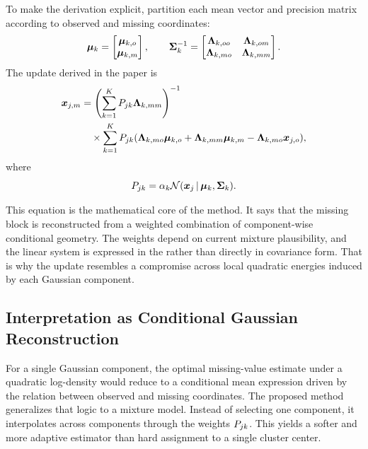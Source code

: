 To make the derivation explicit, partition each mean vector and precision matrix according to observed and missing coordinates:
\[
    \bm{\mu}_k =
    \begin{bmatrix}
        \bm{\mu}_{k,o}\\
        \bm{\mu}_{k,m}
    \end{bmatrix},
    \qquad
    \mathbf{\Sigma}_k^{-1} =
    \begin{bmatrix}
        \mathbf{\Lambda}_{k,oo} & \mathbf{\Lambda}_{k,om}\\
        \mathbf{\Lambda}_{k,mo} & \mathbf{\Lambda}_{k,mm}
    \end{bmatrix}.
\]
The update derived in the paper is
\begin{equation}
\begin{aligned}
    \vect{x}_{j,m}
    &=
    \paren*{
        \sum_{k=1}^{\scal{K}}
        \scal{P}_{jk}\mat{\Lambda}_{k,mm}
    }\inv \\
    &\quad \times
    \sum_{k=1}^{\scal{K}}
    \scal{P}_{jk}
    \paren*{
        \mat{\Lambda}_{k,mo}\vect{\mu}_{k,o}
        +
        \mat{\Lambda}_{k,mm}\vect{\mu}_{k,m}
        -
        \mat{\Lambda}_{k,mo}\vect{x}_{j,o}
    },
\end{aligned}
\end{equation}
where
\[
    \scal{P}_{jk} = \scal{\alpha}_k \N\paren*{\vect{x}_j \given \vect{\mu}_k, \mat{\Sigma}_k}.
\]

This equation is the mathematical core of the method. It says that the missing block is reconstructed from a weighted combination of component-wise conditional geometry. The weights depend on current mixture plausibility, and the linear system is expressed in the  rather than directly in covariance form. That is why the update resembles a compromise across local quadratic energies induced by each Gaussian component.

\subsection{Interpretation as Conditional Gaussian Reconstruction}
For a single Gaussian component, the optimal missing-value estimate under a quadratic log-density would reduce to a conditional mean expression driven by the relation between observed and missing coordinates. The proposed method generalizes that logic to a mixture model. Instead of selecting one component, it interpolates across components through the weights $P_{jk}$. This yields a softer and more adaptive estimator than hard assignment to a single cluster center.

